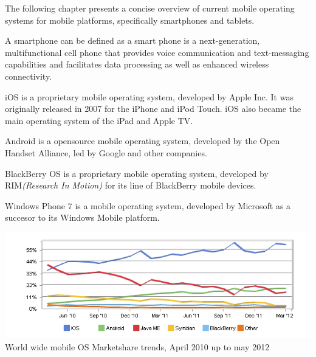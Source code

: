 

The following chapter presents a concise overview of current mobile operating systems for mobile platforms, specifically smartphones and tablets.


A smartphone can be defined as a smart phone is a next-generation, multifunctional cell phone that provides voice communication and text-messaging capabilities and facilitates data processing as well as enhanced wireless connectivity.\cite{Ni2006}

iOS is a proprietary mobile operating system, developed by Apple Inc. It was originally released in 2007 for the iPhone and iPod Touch. iOS also became the main operating system of the iPad and Apple TV.

Android is a opensource mobile operating system, developed by the Open Handset Alliance, led by Google and other companies.\cite{Inc.2012}

BlackBerry OS is a proprietary mobile operating system, developed by RIM\emph{(Research In Motion)} for its line of BlackBerry mobile devices.

Windows Phone 7 is a mobile operating system, developed by Microsoft as a succesor to its Windows Mobile platform.


\begin{centering}
\includegraphics[scale=0.5]{images/marketsharetrendsApril10Tomay12.png}\\{World wide mobile OS Marketshare trends, April 2010 up to may 2012}\\
\end{centering}

